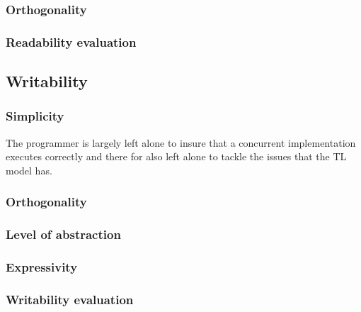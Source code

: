 \subsubsection{Orthogonality}
\subsubsection{Readability evaluation}

\subsection{Writability}
\subsubsection{Simplicity}
 The programmer is largely left alone to insure that a concurrent implementation executes correctly and there for also left alone to tackle the issues that the \ac{TL} model has. 
\subsubsection{Orthogonality}
\subsubsection{Level of abstraction}
\subsubsection{Expressivity}
\subsubsection{Writability evaluation}



\worksheetend
